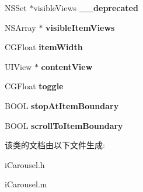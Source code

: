 \begin{DoxyCompactItemize}
\item 
\hypertarget{interfacei_carousel_abc23e4479a36a9a4f44855add9a7bb98}{N\-S\-Set $\ast$visible\-Views {\bfseries \-\_\-\-\_\-deprecated}}\label{interfacei_carousel_abc23e4479a36a9a4f44855add9a7bb98}

\item 
\hypertarget{interfacei_carousel_a3ee29168fea90f140bf9e42e8f19116a}{N\-S\-Array $\ast$ {\bfseries visible\-Item\-Views}}\label{interfacei_carousel_a3ee29168fea90f140bf9e42e8f19116a}

\item 
\hypertarget{interfacei_carousel_ae50617941b46e4151a634d7096f0e6e9}{C\-G\-Float {\bfseries item\-Width}}\label{interfacei_carousel_ae50617941b46e4151a634d7096f0e6e9}

\item 
\hypertarget{interfacei_carousel_ad71bdf138b9ee8fad0fa44ac1f0470d8}{U\-I\-View $\ast$ {\bfseries content\-View}}\label{interfacei_carousel_ad71bdf138b9ee8fad0fa44ac1f0470d8}

\item 
\hypertarget{interfacei_carousel_a7ddbb5c814af239e1e93e1a9636593f5}{C\-G\-Float {\bfseries toggle}}\label{interfacei_carousel_a7ddbb5c814af239e1e93e1a9636593f5}

\item 
\hypertarget{interfacei_carousel_ac73948a13f3fdf9f4412cec8460b8a33}{B\-O\-O\-L {\bfseries stop\-At\-Item\-Boundary}}\label{interfacei_carousel_ac73948a13f3fdf9f4412cec8460b8a33}

\item 
\hypertarget{interfacei_carousel_afc597b9e6b4bbfdca43c5febd82836fb}{B\-O\-O\-L {\bfseries scroll\-To\-Item\-Boundary}}\label{interfacei_carousel_afc597b9e6b4bbfdca43c5febd82836fb}

\end{DoxyCompactItemize}


该类的文档由以下文件生成\-:\begin{DoxyCompactItemize}
\item 
i\-Carousel.\-h\item 
i\-Carousel.\-m\end{DoxyCompactItemize}
